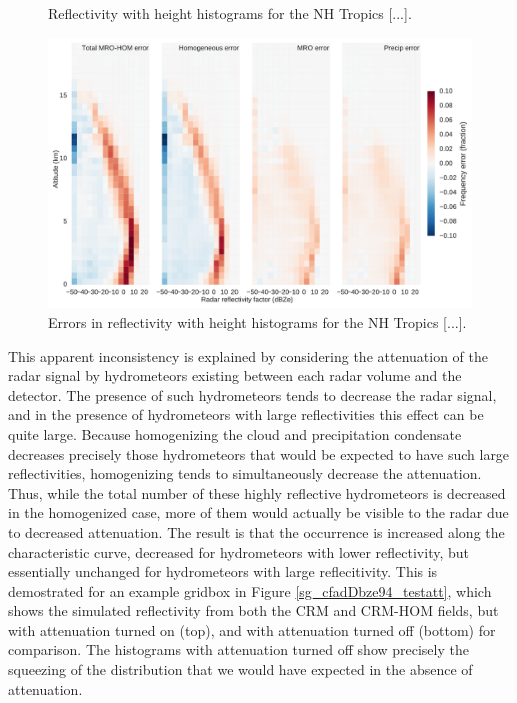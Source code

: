 \begin{figure}
\centering
\caption{Reflectivity with height histograms for the NH Tropics [...].}
\label{sg_cfadDbze94_tropics}
\end{figure}

\begin{figure}
\centering
\includegraphics[width=\columnwidth]{graphics/cfadDbze94_mro-hom_errors.pdf}
\caption{Errors in reflectivity with height histograms for the NH Tropics [...].}
\label{sg_cfadDbze94_tropics_diff}
\end{figure}

This apparent inconsistency is explained by considering the attenuation of the radar signal by hydrometeors existing between each radar volume and the detector. The presence of such hydrometeors tends to decrease the radar signal, and in the presence of hydrometeors with large reflectivities this effect can be quite large. Because homogenizing the cloud and precipitation condensate decreases precisely those hydrometeors that would be expected to have such large reflectivities, homogenizing tends to simultaneously decrease the attenuation. Thus, while the total number of these highly reflective hydrometeors is decreased in the homogenized case, more of them would actually be visible to the radar due to decreased attenuation. The result is that the occurrence is increased along the characteristic curve, decreased for hydrometeors with lower reflectivity, but essentially unchanged for hydrometeors with large reflecitivity. This is demostrated for an example gridbox in Figure \ref{sg_cfadDbze94_testatt}, which shows the simulated reflectivity from both the CRM and CRM-HOM fields, but with attenuation turned on (top), and with attenuation turned off (bottom) for comparison. The histograms with attenuation turned off show precisely the squeezing of the distribution that we would have expected in the absence of attenuation.

